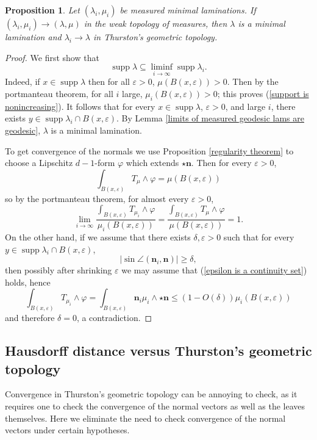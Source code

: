 \documentclass[reqno,11pt]{amsart}
\DeclareMathOperator{\supp}{supp}
\newcommand{\normal}{\mathbf n}
\newtheorem{proposition}[theorem]{Proposition}
\theoremstyle{definition}
\numberwithin{equation}{section}
\begin{document}
\begin{proposition}\label{measured implies Thurston}
Let $(\lambda_i, \mu_i)$ be measured minimal laminations.
If $(\lambda_i, \mu_i) \to (\lambda, \mu)$ in the weak topology of measures, then $\lambda$ is a minimal lamination and $\lambda_i \to \lambda$ in Thurston's geometric topology.
\end{proposition}
\begin{proof}
We first show that
\begin{equation}\label{support is nonincreasing}
	\supp \lambda \subseteq \liminf_{i \to \infty} \supp \lambda_i.
\end{equation}
Indeed, if $x \in \supp \lambda$ then for all $\varepsilon > 0$, $\mu(B(x, \varepsilon)) > 0$.
Then by the portmanteau theorem, for all $i$ large, $\mu_i(B(x, \varepsilon)) > 0$; this proves (\ref{support is nonincreasing}).
It follows that for every $x \in \supp \lambda$, $\varepsilon > 0$, and large $i$, there exists $y \in \supp \lambda_i \cap B(x, \varepsilon)$.
By Lemma \ref{limits of measured geodesic lams are geodesic}, $\lambda$ is a minimal lamination.

To get convergence of the normals we use Proposition \ref{regularity theorem} to choose a Lipschitz $d-1$-form $\varphi$ which extends $\star \normal$.
Then for every $\varepsilon > 0$,
$$\int_{B(x, \varepsilon)} T_\mu \wedge \varphi = \mu(B(x, \varepsilon))$$
so by the portmanteau theorem, for almost every $\varepsilon > 0$,
\begin{equation}\label{epsilon is a continuity set}
	\lim_{i \to \infty} \frac{\int_{B(x, \varepsilon)} T_{\mu_i} \wedge \varphi}{\mu_i(B(x, \varepsilon))} = \frac{\int_{B(x, \varepsilon)} T_\mu \wedge \varphi}{\mu(B(x, \varepsilon))} = 1.
\end{equation}
On the other hand, if we assume that there exists $\delta, \varepsilon > 0$ such that for every $y \in \supp \lambda_i \cap B(x, \varepsilon)$,
$$|\sin \angle(\normal_i, \normal)| \geq \delta,$$
then possibly after shrinking $\varepsilon$ we may assume that (\ref{epsilon is a continuity set}) holds, hence
$$\int_{B(x, \varepsilon)} T_{\mu_i} \wedge \varphi = \int_{B(x, \varepsilon)} \normal_i\mu_i \wedge \star \normal \leq (1 - O(\delta)) \mu_i(B(x, \varepsilon))$$
and therefore $\delta = 0$, a contradiction.
\end{proof}


\subsection{Hausdorff distance versus Thurston's geometric topology}
Convergence in Thurston's geometric topology can be annoying to check, as it requires one to check the convergence of the normal vectors as well as the leaves themselves.
Here we eliminate the need to check convergence of the normal vectors under certain hypotheses.
\end{document}
